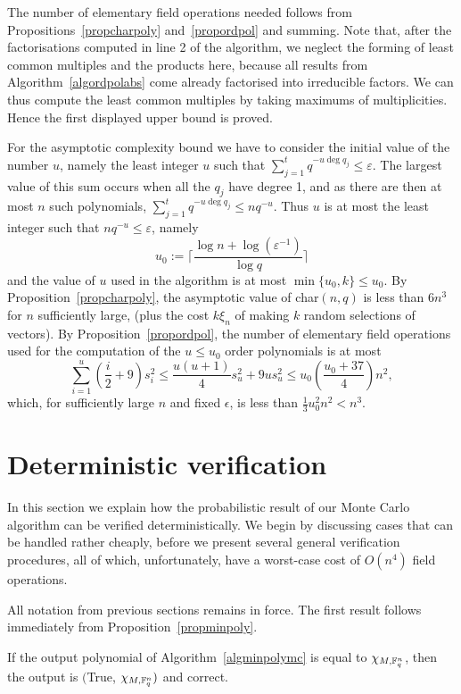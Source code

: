 The number of elementary field operations needed follows from 
Propositions~\ref{propcharpoly} and~\ref{propordpol} and summing. Note that,
after the factorisations computed in line 2 of the algorithm, we neglect
the forming of least common multiples and the products here, because
all results from Algorithm~\ref{algordpolabs} come already factorised
into irreducible factors. We can thus compute the least common multiples
by taking maximums of multiplicities. Hence the first displayed upper
bound is proved.

For the asymptotic complexity bound we have to consider the initial value of the number $u$,
namely the least integer $u$ such that $\sum_{j=1}^t q^{-u \deg q_j} \le \varepsilon$.
The largest value of this sum occurs when all the $q_j$ have degree 1, and as there are 
then at most $n$ such polynomials,  $\sum_{j=1}^t q^{-u \deg q_j}\le nq^{-u}$. 
Thus $u$ is at most the least integer such that $nq^{-u}\le \varepsilon$, namely 
\[
u_0:=\lceil \frac{\log n + \log (\varepsilon^{-1})}{\log q}\rceil
\]
and the value of $u$ used in the algorithm is at most $\min\{u_0,k\}\leq u_0$.
By Proposition~\ref{propcharpoly}, the asymptotic value of char$(n,q)$ is
less than $6n^3$ for $n$ sufficiently large, (plus the cost $k\xi_n$ 
of making $k$ random selections of vectors). 
By Proposition~\ref{propordpol},  the number of elementary
field operations used for the computation of the  $u\le u_0$ order polynomials
is at most
\[
\sum_{i=1}^u(\frac{i}{2}+9)s_i^2 \leq \frac{u(u+1)}{4}s_u^2+9us_u^2
\le u_0\left(\frac{u_0+37}{4}\right) n^2,
\]
which, for sufficiently large $n$ and fixed $\epsilon$, is less than
$\frac{1}{3}u_0^2n^2<n^3$.
\proofend

\section{Deterministic verification}
\label{verify}
%

In this section we explain how the probabilistic result of our Monte
Carlo algorithm can be verified deterministically. We begin by
discussing cases that can be handled rather cheaply, before we present
several general verification procedures, all of which, unfortunately,
have a worst-case cost of $O(n^4)$ field operations.

All notation from previous sections remains in force. The first result 
follows immediately from Proposition~\ref{propminpoly}.

\begin{Prop}
If the output polynomial of Algorithm~\ref{algminpolymc} is equal to 
$\chi_{M,\mathbb{F}_q^n}$, then the output is $(${\sc True}, $\chi_{M,\mathbb{F}_q^n})$
and correct.
\end{Prop}


